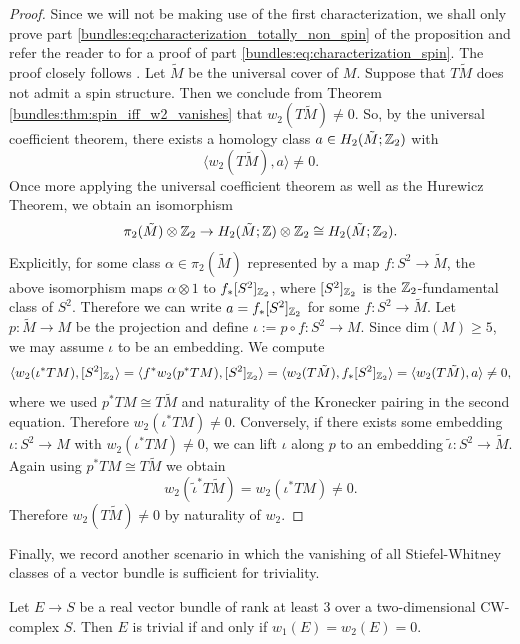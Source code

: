 \begin{proof}
    Since we will not be making use of the first characterization, we shall only prove part \ref{bundles:eq:characterization_totally_non_spin} of the proposition and refer the reader to \cite[Prop. 2.6]{Frenck2026Doubling} for a proof of part \ref{bundles:eq:characterization_spin}. The proof closely follows \cite{Frenck2026Doubling}. Let $\tilde{M}$ be the universal cover of $M$. Suppose that $T\tilde{M}$ does not admit a spin structure. Then we conclude from Theorem \ref{bundles:thm:spin_iff_w2_vanishes} that $w_2(T\tilde{M}) \neq 0$. So, by the universal coefficient theorem, there exists a homology class $a \in H_2(\tilde{M};\mathbb{Z}_2)$ with 
    \[
    \langle w_2(T\tilde{M}), a\rangle \neq 0.
    \]
    Once more applying the universal coefficient theorem as well as the Hurewicz Theorem, we obtain an isomorphism
    \[
    \pi_2(\tilde{M}) \otimes \mathbb{Z}_2 \to H_2(\tilde{M};\mathbb{Z}) \otimes \mathbb{Z}_2 \cong H_2(\tilde{M};\mathbb{Z}_2). 
    \]
    Explicitly, for some class $\alpha \in \pi_2(\tilde{M})$ represented by a map $f \colon S^2 \to \tilde{M}$, the above isomorphism maps $\alpha \otimes 1$ to $f_\ast [S^2]_{\mathbb{Z}_2}$, where $[S^2]_{\mathbb{Z}_2}$ is the $\mathbb{Z}_2$-fundamental class of $S^2$. Therefore we can write $a = f_\ast [S^2]_{\mathbb{Z}_2}$ for some $f \colon S^2 \to \tilde{M}$. Let $p \colon \tilde{M} \to M$ be the projection and define $\iota := p \circ f \colon S^2 \to M$. Since $\mathrm{dim}(M) \geq 5$, we may assume $\iota$ to be an embedding. We compute 
    \[
    \langle w_2(\iota^\ast TM), [S^2]_{\mathbb{Z}_2}\rangle = \langle f^\ast w_2(p^\ast TM), [S^2]_{\mathbb{Z}_2}\rangle = \langle w_2(T\tilde{M}), f_\ast [S^2]_{\mathbb{Z}_2}\rangle = \langle w_2(T\tilde{M}), a \rangle \neq 0,
    \]
    where we used $p^\ast TM \cong T \tilde{M}$ and naturality of the Kronecker pairing in the second equation. Therefore $w_2(\iota^\ast TM) \neq 0$. Conversely, if there exists some embedding $\iota \colon S^2 \to M$ with $w_2(\iota^\ast TM) \neq 0$, we can lift $\iota$ along $p$ to an embedding $\tilde{\iota} \colon S^2 \to \tilde{M}$. Again using $p^\ast TM \cong T\tilde{M}$ we obtain 
    \[
    w_2(\tilde{\iota}^\ast T\tilde{M}) = w_2(\iota^\ast TM) \neq 0.
    \]
    Therefore $w_2(T\tilde{M}) \neq 0$ by naturality of $w_2$.
\end{proof}

Finally, we record another scenario in which the vanishing of all Stiefel-Whitney classes of a vector bundle is sufficient for triviality.

\begin{lemma}
    \label{bundles:lem:criterion_for_triviality}
    Let $E \to S$ be a real vector bundle of rank at least $3$ over a two-dimensional CW-complex $S$. Then $E$ is trivial if and only if $w_1(E) = w_2(E) = 0$.
\end{lemma}

